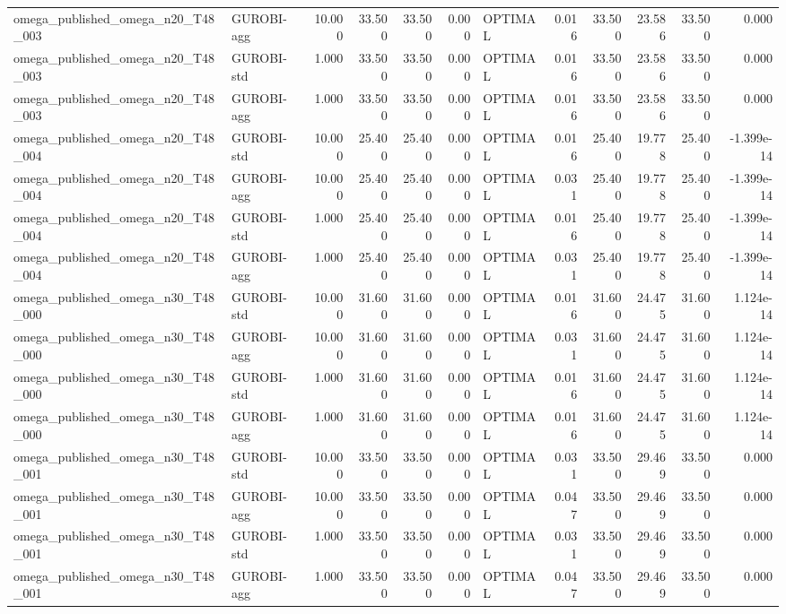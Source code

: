 \begin{table}[htbp]
\begin{tabular}{llrrrrlrrrrr}
omega\_published\_omega\_n20\_T48\_003 & GUROBI-agg & 10.000 & 33.500 & 33.500 & 0.000 & OPTIMAL & 0.016 & 33.500 & 23.586 & 33.500 & 0.000 \\
omega\_published\_omega\_n20\_T48\_003 & GUROBI-std & 1.000 & 33.500 & 33.500 & 0.000 & OPTIMAL & 0.016 & 33.500 & 23.586 & 33.500 & 0.000 \\
omega\_published\_omega\_n20\_T48\_003 & GUROBI-agg & 1.000 & 33.500 & 33.500 & 0.000 & OPTIMAL & 0.016 & 33.500 & 23.586 & 33.500 & 0.000 \\
omega\_published\_omega\_n20\_T48\_004 & GUROBI-std & 10.000 & 25.400 & 25.400 & 0.000 & OPTIMAL & 0.016 & 25.400 & 19.778 & 25.400 & -1.399e-14 \\
omega\_published\_omega\_n20\_T48\_004 & GUROBI-agg & 10.000 & 25.400 & 25.400 & 0.000 & OPTIMAL & 0.031 & 25.400 & 19.778 & 25.400 & -1.399e-14 \\
omega\_published\_omega\_n20\_T48\_004 & GUROBI-std & 1.000 & 25.400 & 25.400 & 0.000 & OPTIMAL & 0.016 & 25.400 & 19.778 & 25.400 & -1.399e-14 \\
omega\_published\_omega\_n20\_T48\_004 & GUROBI-agg & 1.000 & 25.400 & 25.400 & 0.000 & OPTIMAL & 0.031 & 25.400 & 19.778 & 25.400 & -1.399e-14 \\
omega\_published\_omega\_n30\_T48\_000 & GUROBI-std & 10.000 & 31.600 & 31.600 & 0.000 & OPTIMAL & 0.016 & 31.600 & 24.475 & 31.600 & 1.124e-14 \\
omega\_published\_omega\_n30\_T48\_000 & GUROBI-agg & 10.000 & 31.600 & 31.600 & 0.000 & OPTIMAL & 0.031 & 31.600 & 24.475 & 31.600 & 1.124e-14 \\
omega\_published\_omega\_n30\_T48\_000 & GUROBI-std & 1.000 & 31.600 & 31.600 & 0.000 & OPTIMAL & 0.016 & 31.600 & 24.475 & 31.600 & 1.124e-14 \\
omega\_published\_omega\_n30\_T48\_000 & GUROBI-agg & 1.000 & 31.600 & 31.600 & 0.000 & OPTIMAL & 0.016 & 31.600 & 24.475 & 31.600 & 1.124e-14 \\
omega\_published\_omega\_n30\_T48\_001 & GUROBI-std & 10.000 & 33.500 & 33.500 & 0.000 & OPTIMAL & 0.031 & 33.500 & 29.469 & 33.500 & 0.000 \\
omega\_published\_omega\_n30\_T48\_001 & GUROBI-agg & 10.000 & 33.500 & 33.500 & 0.000 & OPTIMAL & 0.047 & 33.500 & 29.469 & 33.500 & 0.000 \\
omega\_published\_omega\_n30\_T48\_001 & GUROBI-std & 1.000 & 33.500 & 33.500 & 0.000 & OPTIMAL & 0.031 & 33.500 & 29.469 & 33.500 & 0.000 \\
omega\_published\_omega\_n30\_T48\_001 & GUROBI-agg & 1.000 & 33.500 & 33.500 & 0.000 & OPTIMAL & 0.047 & 33.500 & 29.469 & 33.500 & 0.000 \\

\end{tabular}
\end{table}
